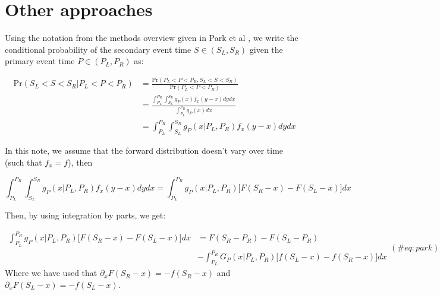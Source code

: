 \documentclass[10pt,letterpaper]{article}
\begin{document}






\appendix \section{Other approaches} 


Using the notation from the methods overview given in Park et al \cite{Park2024.01.12.24301247}, we write the conditional probability of the secondary event time $S\in (S_L,S_R)$ given the primary event time $P \in (P_L,P_R)$ as:

\begin{equation}
\begin{aligned}
\mathrm{Pr}(S_L < S < S_R | P_L < P < P_R) &= \frac{\mathrm{Pr}(P_L < P < P_R, S_L < S < S_R)}{\mathrm{Pr}(P_L < P < P_R)} \\
   &= \frac{\int_{P_L}^{P_R} \int_{S_L}^{S_R} g_P(x) f_x(y-x) dy dx}{\int_{P_L}^{P_R} g_P(x) dx}\\
   &= \int_{P_L}^{P_R} \int_{S_L}^{S_R} g_P(x|P_L, P_R) f_x(y-x)dy dx
\end{aligned}
\end{equation}

In this note, we assume that the forward distribution doesn't vary over time (such that $f_x = f$), then

\begin{equation}
\int_{P_L}^{P_R} \int_{S_L}^{S_R} g_P(x|P_L, P_R) f_x(y-x)dy dx = \int_{P_L}^{P_R} g_P(x|P_L, P_R) \big[F(S_R - x) - F(S_L - x)\big] dx
\end{equation}

Then, by using integration by parts, we get:

\begin{equation}
\begin{split}
\int_{P_L}^{P_R} g_P(x|P_L, P_R) \big[F(S_R - x) - F(S_L - x)\big] dx &=
F(S_R - P_R) - F(S_L - P_R)  \\ & - \int_{P_L}^{P_R} G_P(x|P_L, P_R) \big[f(S_L - x) - f(S_R - x)\big] dx
\end{split} (\#eq:park)
\end{equation}
Where we have used that $\partial_x F(S_R - x) = - f(S_R - x)$ and $\partial_x F(S_L - x) = - f(S_L - x)$.
\end{document}
